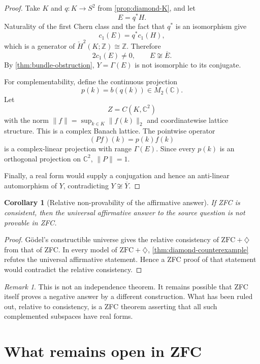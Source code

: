 \documentclass[11pt]{article}
\newtheorem{corollary}[theorem]{Corollary}
\theoremstyle{definition}
\theoremstyle{remark}
\newtheorem{remark}[theorem]{Remark}
\newcommand{\C}{\mathbb C}
\newcommand{\Z}{\mathbb Z}
\newcommand{\Hcheck}{\check H}
\begin{document}
\begin{proof}
Take $K$ and $q:K\to S^2$ from \cref{prop:diamond-K}, and let
\[
       E=q^*H.
\]
Naturality of the first Chern class and the fact that $q^*$ is an isomorphism give
\[
       c_1(E)=q^*c_1(H),
\]
which is a generator of $\Hcheck^2(K;\Z)\cong\Z$. Therefore
\[
       2c_1(E)\ne0,
       \qquad E\not\cong\overline E.
\]
By \cref{thm:bundle-obstruction}, $Y=\Gamma(E)$ is not isomorphic to its conjugate.

For complementability, define the continuous projection
\[
       p(k)=b(q(k))\in M_2(\C).
\]
Let
\[
       Z=C(K,\C^2)
\]
with the norm $\|f\|=\sup_{k\in K}\|f(k)\|_2$ and coordinatewise lattice structure. This is a complex Banach lattice. The pointwise operator
\[
       (Pf)(k)=p(k)f(k)
\]
is a complex-linear projection with range $\Gamma(E)$. Since every $p(k)$ is an orthogonal projection on $\C^2$, $\|P\|=1$.

Finally, a real form would supply a conjugation and hence an anti-linear automorphism of $Y$, contradicting $Y\not\cong\overline Y$.
\end{proof}

\begin{corollary}[Relative non-provability of the affirmative answer]\label{cor:relative-consistency}
If ZFC is consistent, then the universal affirmative answer to the source question is not provable in ZFC.
\end{corollary}

\begin{proof}
G\"odel's constructible universe gives the relative consistency of $\mathrm{ZFC}+\diamondsuit$ from that of ZFC. In every model of $\mathrm{ZFC}+\diamondsuit$, \cref{thm:diamond-counterexample} refutes the universal affirmative statement. Hence a ZFC proof of that statement would contradict the relative consistency.
\end{proof}

\begin{remark}
This is not an independence theorem. It remains possible that ZFC itself proves a negative answer by a different construction. What has been ruled out, relative to consistency, is a ZFC theorem asserting that all such complemented subspaces have real forms.
\end{remark}

\section{What remains open in ZFC}
\end{document}
